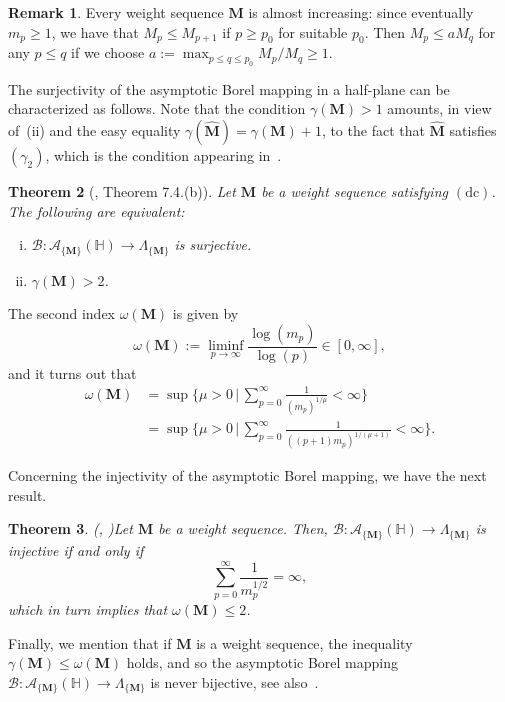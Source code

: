 \documentclass[12pt,a4paper]{article}
\newcommand{\HH}{\mathbb{H}}
\newcommand{\M}{{\boldsymbol{M}}}
\newcommand{\hM}{\widehat{{\boldsymbol{M}}}}
\newcommand{\dc}{\operatorname{(dc)}}
\newcommand{\om}{\omega}
\theoremstyle{plain}
\newtheorem{theorem}{Theorem}[section]
\theoremstyle{definition}
\newtheorem{remark}[theorem]{Remark}
\numberwithin{equation}{section}
\begin{document}
\begin{remark}\label{rem.weight.almost.incr}
Every weight sequence $\M$ is almost increasing: since eventually $m_p\ge 1$, we have that $M_p\le M_{p+1}$ if $p\ge p_0$ for suitable $p_0$. Then $M_p\le a M_q$ for any $p\le q$ if we choose $a:=\max_{p\le q\le p_0}M_p/M_q\ge 1$.
\end{remark}


The surjectivity of the asymptotic Borel mapping in a half-plane can be characterized as follows. Note that the condition $\gamma(\M)>1$ amounts, in view of~(ii) and the easy equality $\gamma(\hM)=\gamma(\M)+1$, to the fact that $\hM$ satisfies $(\gamma_2)$, which is the condition appearing in~\cite[Thm. 7.4.(b)]{momentsdebrouwere}.

\begin{theorem}[\cite{momentsdebrouwere}, Theorem 7.4.(b)]\label{teor.Andreas}
Let $\M$ be a weight sequence satisfying $\dc$. The following are equivalent:
\begin{enumerate}[(i)]
\item $\mathcal{B}\colon \mathcal{A}_{\{\M\}}(\HH)\to\Lambda_{\{\M\}}$ is surjective.
\item $\gamma(\M)>2$.
\end{enumerate}
\end{theorem}

The second index $\om(\M)$ is given by
$$\om(\M):= \displaystyle\liminf_{p\to\infty} \frac{\log(m_{p})}{\log(p)}\in[0,\infty],
$$
and it turns out that
\begin{align*}
\om(\M)&=\sup\{\mu>0\, | \, \sum^\infty_{p=0} \frac{1}{(m_p)^{1/\mu}}<\infty \}\\
&=\sup\{\mu>0 \, | \, \sum^\infty_{p=0} \frac{1}{((p+1)m_p)^{1/(\mu+1)}} < \infty \}.
\end{align*}

Concerning the injectivity of the asymptotic Borel mapping, we have the next result.
\begin{theorem} \emph{(\cite[Thm.\ 12]{Salinas}, \cite[Thm.\ 3.4]{JG-S-S})}\label{inj-borel-dm} Let $\M$ be a weight sequence. Then, $\mathcal{B}: \mathcal{A}_{\{\M\}}(\HH) \rightarrow \Lambda_{\{\M\}}$ is injective if and only if
$$
\sum_{p = 0}^\infty \frac{1}{m_p^{1/2}} = \infty,
$$
which in turn implies that $\om(\M)\le 2$.
\end{theorem}

Finally, we mention that if $\M$ is a weight sequence, the inequality $\gamma(\M)\le\omega(\M)$ holds, and so the asymptotic Borel mapping  $\mathcal{B}: \mathcal{A}_{\{\M\}}(\HH) \rightarrow \Lambda_{\{\M\}}$ is never bijective, see also~\cite[Thm.\ 3.17]{JG-S-S}.
\end{document}

